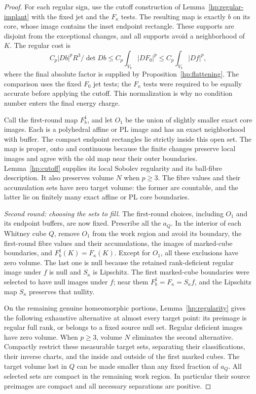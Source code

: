 \documentclass[11pt]{article}
\numberwithin{equation}{section}
\theoremstyle{definition}
\theoremstyle{remark}
\begin{document}
\begin{proof}
For each regular sign, use the cutoff construction of
Lemma~\ref{hp:regular-implant} with the fixed jet and the
$F_\kappa$ tests.  The resulting map is exactly $b$
on its core, whose image contains the inset endpoint rectangle.
These supports are disjoint from the exceptional changes, and all
supports avoid a neighborhood of $K$.  The regular cost is
\[
 C_p |Db|^pR^3/\det Db
       \leq C_p\int_{V_b}|DF_0|^p
       \leq C_p\int_{V_b}|Df|^p,
\]
where the final absolute factor is supplied by
Proposition~\ref{hp:flattening}.  The comparison uses the fixed
$F_0$ jet tests; the $F_\kappa$ tests were required to be equally
accurate before applying the cutoff.  This normalization is why no
condition number enters the final energy charge.

Call the first-round map $F_b^1$, and let $O_1$ be the union of
slightly smaller exact core images.  Each is a polyhedral affine or
PL image and has an exact neighborhood with buffer.  The compact
endpoint rectangles lie strictly inside this open set.  The map is
proper, onto and continuous because the finite changes preserve
local images and agree with the old map near their outer boundaries.
Lemma~\ref{hp:cutoff} supplies its local Sobolev regularity and its
ball-fibre description.  It also preserves volume $N$ when $p\geq3$.
The fibre values and their accumulation sets have zero target
volume: the former are countable, and the latter lie on finitely
many exact affine or PL core boundaries.

\emph{Second round: choosing the sets to fill.}
The first-round choices, including $O_1$ and its endpoint buffers,
are now fixed.  Prescribe all the $a_Q$.  In the interior of each
Whitney cube $Q$, remove $O_1$ from the work region and avoid its
boundary, the first-round fibre values and their accumulations, the
images of marked-cube boundaries, and $F_b^1(K)=F_\kappa(K)$.
Except for $O_1$, all these exclusions have zero volume.  The last
one is null because the retained rank-deficient regular image under
$f$ is null and $S_\kappa$ is Lipschitz.  The first marked-cube boundaries were selected to have null images
under $f$; near them $F_b^1=F_\kappa=S_\kappa f$, and the
Lipschitz map $S_\kappa$ preserves that nullity.

On the remaining genuine homeomorphic portions,
Lemma~\ref{hp:regularity} gives the following exhaustive alternative
at almost every target point: its preimage is regular full rank, or
belongs to a fixed source null set.  Regular deficient images have
zero volume.  When $p\geq3$, volume $N$ eliminates the second
alternative.  Compactly restrict these measurable target sets,
separating their classifications, their inverse charts, and the
inside and outside of the first marked cubes.  The target volume
lost in $Q$ can be made smaller than any fixed fraction of $a_Q$.
All selected sets are compact in the remaining work region.  In
particular their source preimages are compact and all necessary
separations are positive.


\end{proof}
\end{document}
